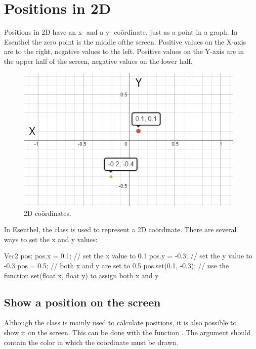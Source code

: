 \chapter{Positions in 2D}
\label{chapter:positions}

Positions in 2D have an x- and a y- co\"ordinate, just as a point in a graph. In Esenthel the zero point is the middle ofthe screen. Positive values on the X-axis are to the right, negative values to the left. Positive values on the Y-axis are in the upper half of the screen, negative values on the lower half.

\begin{figure}[h]
\centering
\includegraphics[width=0.7\linewidth]{../images/2Dpositions}
\caption[]{2D co\"ordinates.}
\label{fig:pos2D}
\end{figure}

In Esenthel, the class  is used to represent a 2D co\"ordinate. There are several ways to set the x and y values:

\begin{code}
Vec2 pos;
pos.x =  0.1; // set the x value to  0.1
pos.y = -0.3; // set the y value to -0.3
pos   =  0.5; // both x and y are set to 0.5
pos.set(0.1, -0.3); // use the function set(float x, float y) to assign both x and y
\end{code}

\section{Show a position on the screen}

Although the class  is mainly used to calculate positions, it is also possible to show it on the screen. This can be done with the function . The argument should contain the color in which the co\"ordinate must be drawn.


